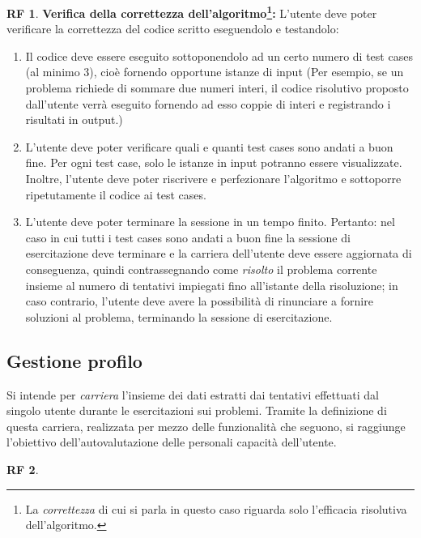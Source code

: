 \documentclass[11pt, a4paper]{article}
\theoremstyle{definition}
\newtheorem{funcreq}{RF} %
\begin{document}
\begin{funcreq}
\textbf{Verifica della correttezza dell'algoritmo\footnote{La \textit{correttezza} di cui si parla in questo caso riguarda solo l'efficacia risolutiva dell'algoritmo.}:}
L'utente deve poter verificare la correttezza del codice scritto eseguendolo
e testandolo:
\begin{enumerate}
    \item Il codice deve essere eseguito sottoponendolo ad un certo numero
    di test cases (al minimo 3),
    cioè fornendo opportune istanze di input (Per esempio,
    se un problema richiede di sommare due numeri interi, il codice risolutivo
    proposto dall'utente verrà eseguito fornendo ad esso coppie di interi
    e registrando i risultati in output.)

    \item L'utente deve poter verificare quali e quanti test cases sono andati
    a buon fine. Per ogni test case, solo le istanze in input potranno
    essere visualizzate. Inoltre, l'utente deve poter riscrivere e
    perfezionare l'algoritmo e sottoporre ripetutamente il codice ai
    test cases.

    \item L'utente deve poter terminare la sessione in un tempo finito.
    Pertanto: nel caso in cui tutti i test cases sono andati a buon fine
    la sessione di esercitazione deve terminare e la carriera dell'utente
    deve essere aggiornata di conseguenza, quindi contrassegnando come
    \textit{risolto} il problema corrente insieme al numero di
    tentativi impiegati fino all'istante della risoluzione; in caso contrario,
    l'utente deve avere la possibilità di rinunciare a fornire soluzioni
    al problema, terminando la sessione di esercitazione.
\end{enumerate}
\end{funcreq}

\subsection{Gestione profilo}
Si intende per \textit{carriera} l'insieme dei dati estratti dai tentativi
effettuati dal singolo utente durante le esercitazioni sui problemi. Tramite
la definizione di questa carriera, realizzata per mezzo delle funzionalità
che seguono, si raggiunge l'obiettivo dell'autovalutazione delle personali
capacità dell'utente.

\begin{funcreq}
\end{funcreq}
\end{document}
